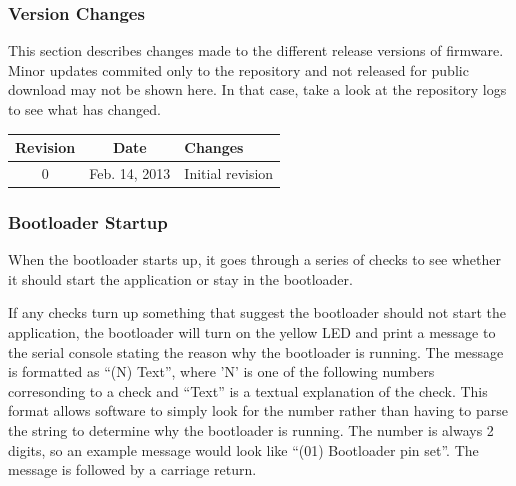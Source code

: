 \documentclass{article}
\begin{document}
\subsubsection{Version Changes} \label{sssec:FWBootChanges}
This section describes changes made to the different release versions of firmware.  Minor updates
commited only to the repository and not released for public download may not be shown here.  In that
case, take a look at the repository logs to see what has changed.

\begin{center}
    \begin{tabular}{c|c|p{}}
        Revision & Date & Changes \\
        \hline
        0 & Feb. 14, 2013 & Initial revision \\
    \end{tabular}
\end{center}

\subsubsection{Bootloader Startup} \label{sssec:FWBootStartup}
When the bootloader starts up, it goes through a series of checks to see whether it should start the
application or stay in the bootloader.

If any checks turn up something that suggest the bootloader should not start the application, the
bootloader will turn on the yellow LED and print a message to the serial console stating the reason
why the bootloader is running.  The message is formatted as ``(N) Text'', where 'N' is one of the
following numbers corresonding to a check and ``Text'' is a textual explanation of the check.  This
format allows software to simply look for the number rather than having to parse the string to
determine why the bootloader is running.  The number is always 2 digits, so an example message would
look like ``(01) Bootloader pin set''.  The message is followed by a carriage return.
\end{document}
